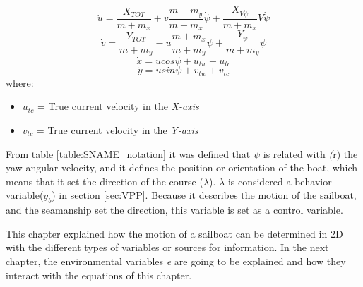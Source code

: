 \begin{equation}\label{eq:u_dot}
    \Dot{u}=\frac{X_{TOT}}{m+m_{x}}+v\frac{m+m_{y}}{m+m_{x}} \Dot{\psi}+\frac{X_{V\Dot{\psi}}}{m+m_{x}}V\Dot{\psi}
\end{equation}
\begin{equation}\label{v_dot}
    \Dot{v}=\frac{Y_{TOT}}{m+m_{y}}-u\frac{m+m_{x}}{m+m_{y}} \Dot{\psi}+ \frac{Y_{\Dot{\psi}}}{m+m_{y}}\Dot{\psi}
\end{equation}
\begin{equation}\label{x_dot}
    \Dot{x}=ucos\psi +u_{tw}+u_{tc}
\end{equation}
\begin{equation}\label{y_dot}
    \Dot{y}=usin\psi +v_{tw}+v_{tc}
\end{equation}
where:
\begin{itemize}
    \item $u_{tc}$ = True current velocity in the \textit{X-axis}
    \item $v_{tc}$ = True current velocity in the \textit{Y-axis}
\end{itemize}
From table \ref{table:SNAME_notation} it was defined that $\psi$ is related with \textit(r) the yaw angular velocity, and it defines the position or orientation of the boat, which means that it set the direction of the course ($\lambda$).  $\lambda$ is considered a behavior variable(\textit{$y_{b}$}) in section \ref{sec:VPP}. %
Because it describes the motion of the sailboat, and the seamanship set the direction, this variable is set as a control variable.\par

This chapter explained how the motion of a sailboat can be determined in 2D with the different types of variables or sources for information. In the next chapter, the environmental variables \textit{e} are going to be explained and how they interact with the equations of this chapter.